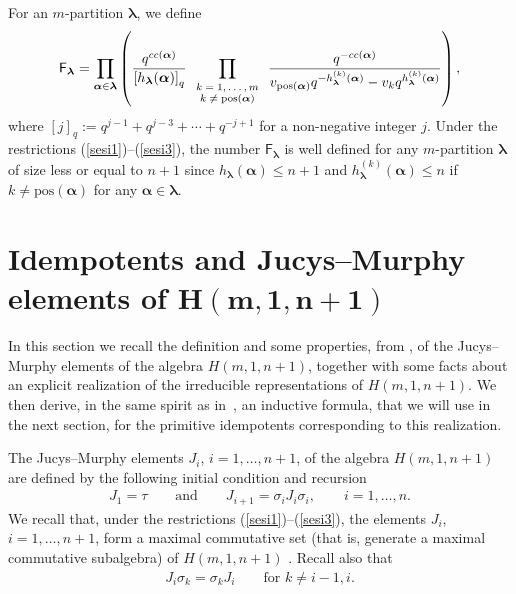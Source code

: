 \documentclass[pdftex]{sigma}
\newcommand{\pos}{{\mathrm{pos}}}
\newcommand{\cc}{cc}
\newcommand{\lam}{\boldsymbol{\lambda}}
\newcommand{\alm}{\boldsymbol{\alpha}}
\begin{document}
For an $m$-partition $\lam$, we def\/ine
\begin{gather}\label{m-croc2}
\textsf{F}_{\lam}=\prod_{\alm\in \lam}\left(\frac{q^{\cc(\alm)}}{\left[h_{\lam}(\alm)\right]_q}\prod_{\textrm{\scriptsize{$\begin{array}{c}k=1,\dots,m\\k\neq\pos(\alm)\end{array}$}}}
\frac{q^{-\cc(\alm)}}{v_{\pos(\alm)}q^{-h^{(k)}_{\lam}(\alm)}-v_kq^{h^{(k)}_{\lam}(\alm)}}\right) ,
\end{gather}
where $[j]_q:=q^{j-1}+q^{j-3}+\cdots +q^{-j+1}$ for a non-negative integer $j$. Under the restrictions (\ref{sesi1})--(\ref{sesi3}),
the number $\textsf{F}_{\lam}$ is well def\/ined for any $m$-partition $\lam$ of size less or equal to $n+1$ since
$h_{\lam}(\alm)\leq n+1$ and $h^{(k)}_{\lam}(\alm)\leq n$ if $k\neq\pos(\alm)$ for any $\alm\in \lam$.


\section[Idempotents and Jucys--Murphy elements of $H(m,1,n+1)$]{Idempotents and Jucys--Murphy elements of $\boldsymbol{H(m,1,n+1)}$}\label{sec-idem}

In this section we recall the def\/inition and some properties, from  \cite{AK},
of the Jucys--Murphy elements of the algebra $H(m,1,n+1)$, together with some facts about an explicit realization of the irreducible representations of $H(m,1,n+1)$. We then derive, in the same spirit as in~\cite{Mo}, an inductive formula, that we will use in the next section, for the primitive idempotents corresponding to this realization.


The Jucys--Murphy elements $J_i$, $i=1,\dots,n+1$, of the algebra $H(m,1,n+1)$ are def\/ined by the following initial condition and recursion
\begin{gather*}%
J_1=\tau\qquad\textrm{and}\qquad J_{i+1}=\sigma_iJ_i\sigma_i,\qquad i=1,\dots,n.
\end{gather*}
We recall that, under the restrictions (\ref{sesi1})--(\ref{sesi3}), the elements $J_i$, $i=1,\dots,n+1$, form a maximal commutative set
(that is, generate a maximal commutative subalgebra) of $H(m,1,n+1)$ \cite[Proposition~3.17]{AK}.
Recall also that
\begin{gather*}%
J_i\sigma_k=\sigma_kJ_i\qquad\textrm{for \ \ $k\neq i-1,i$.}
\end{gather*}
\end{document}
